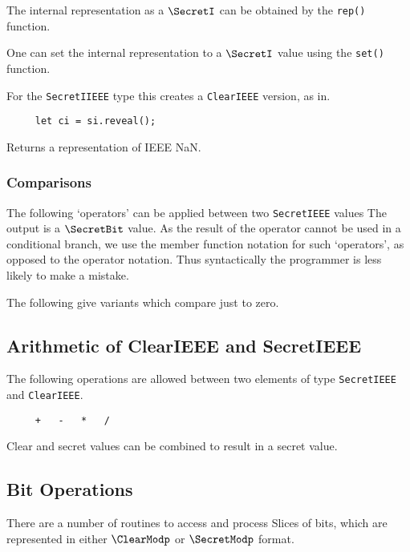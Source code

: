 The internal representation as a $\SecretI$ can be obtained by the
\verb|rep()| function.

One can set the internal representation to a $\SecretI$ value using
the \verb|set()| function.

For the \verb|SecretIIEEE| type this creates a \verb|ClearIEEE| version, as in.
\begin{lstlisting}
     let ci = si.reveal();
\end{lstlisting}

Returns a representation of IEEE NaN.



\subsubsection{Comparisons}
The following `operators' can be applied between two \verb|SecretIEEE| values
The output is a $\SecretBit$ value.
As the result of the operator cannot be used in a conditional branch,
we use the member function notation for such `operators', as opposed
to the operator notation. Thus syntactically the programmer is less
likely to make a mistake.

\noindent
The following give variants which compare just to zero.


\subsection{Arithmetic of ClearIEEE and SecretIEEE}
The following operations are allowed between two elements of type 
\verb|SecretIEEE| and \verb|ClearIEEE|.
\begin{verbatim}
     +   -   *   /
\end{verbatim}
Clear and secret values can be combined to result in a secret value.

\subsection{Bit Operations}
There are a number of routines to access and process Slices of bits,
which are represented in either $\ClearModp$ or $\SecretModp$ format.

